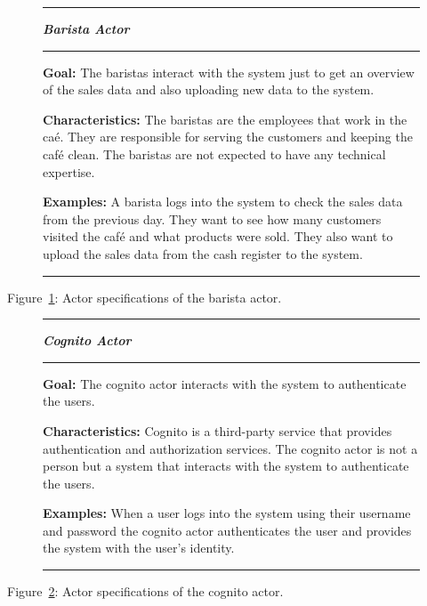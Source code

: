 \begin{figure}[H]
    \noindent
    \rule{\textwidth}{0.4pt}
    \begin{center}
    \noindent
    \textit{\textbf{Barista Actor}}
    \end{center}

    \noindent
    \rule{\textwidth}{0.4pt}

    \noindent
    \textbf{Goal:} The baristas interact with the system just to get an overview of the sales data and also uploading
    new data to the system.
    \newline

    \noindent
    \textbf{Characteristics:} The baristas are the employees that work in the caé.
    They are responsible for serving the customers and keeping the café clean.
    The baristas are not expected to have any technical expertise.
    \newline

    \noindent
    \textbf{Examples:} A barista logs into the system to check the sales data from the previous day.
    They want to see how many customers visited the café and what products were sold.
    They also want to upload the sales data from the cash register to the system.

    \noindent
    \rule{\textwidth}{0.04pt}\label{fig:actor-barista}
\end{figure}

Figure~\ref{fig:actor-barista}: Actor specifications of the barista actor.
\newline

\begin{figure}[H]
    \noindent
    \rule{\textwidth}{0.4pt}
    \begin{center}
        \noindent
        \textit{\textbf{Cognito Actor}}
    \end{center}

    \noindent
    \rule{\textwidth}{0.4pt}

    \noindent
    \textbf{Goal:} The cognito actor interacts with the system to authenticate the users.
    \newline

    \noindent
    \textbf{Characteristics:} Cognito is a third-party service that provides authentication and authorization services.
    The cognito actor is not a person but a system that interacts with the system to authenticate the users.
    \newline

    \noindent
    \textbf{Examples:} When a user logs into the system using their username and password the cognito actor
    authenticates the user and provides the system with the user's identity.

    \noindent
    \rule{\textwidth}{0.4pt}\label{fig:actor-cognito}
\end{figure}

Figure~\ref{fig:actor-cognito}: Actor specifications of the cognito actor.
